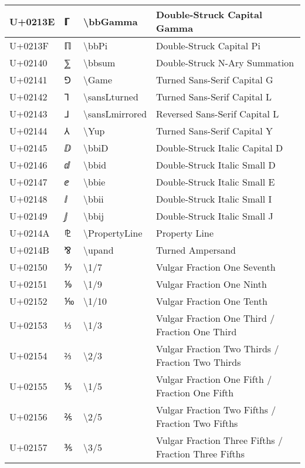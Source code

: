 \begin{table}[h]
\begin{tabulary}{\linewidth}{|L|L|L|L|}
\hline
U+0213E & ℾ & {\textbackslash}bbGamma & Double-Struck Capital Gamma \\
\hline
U+0213F & ℿ & {\textbackslash}bbPi & Double-Struck Capital Pi \\
\hline
U+02140 & ⅀ & {\textbackslash}bbsum & Double-Struck N-Ary Summation \\
\hline
U+02141 & ⅁ & {\textbackslash}Game & Turned Sans-Serif Capital G \\
\hline
U+02142 & ⅂ & {\textbackslash}sansLturned & Turned Sans-Serif Capital L \\
\hline
U+02143 & ⅃ & {\textbackslash}sansLmirrored & Reversed Sans-Serif Capital L \\
\hline
U+02144 & ⅄ & {\textbackslash}Yup & Turned Sans-Serif Capital Y \\
\hline
U+02145 & ⅅ & {\textbackslash}bbiD & Double-Struck Italic Capital D \\
\hline
U+02146 & ⅆ & {\textbackslash}bbid & Double-Struck Italic Small D \\
\hline
U+02147 & ⅇ & {\textbackslash}bbie & Double-Struck Italic Small E \\
\hline
U+02148 & ⅈ & {\textbackslash}bbii & Double-Struck Italic Small I \\
\hline
U+02149 & ⅉ & {\textbackslash}bbij & Double-Struck Italic Small J \\
\hline
U+0214A & ⅊ & {\textbackslash}PropertyLine & Property Line \\
\hline
U+0214B & ⅋ & {\textbackslash}upand & Turned Ampersand \\
\hline
U+02150 & ⅐ & {\textbackslash}1/7 & Vulgar Fraction One Seventh \\
\hline
U+02151 & ⅑ & {\textbackslash}1/9 & Vulgar Fraction One Ninth \\
\hline
U+02152 & ⅒ & {\textbackslash}1/10 & Vulgar Fraction One Tenth \\
\hline
U+02153 & ⅓ & {\textbackslash}1/3 & Vulgar Fraction One Third / Fraction One Third \\
\hline
U+02154 & ⅔ & {\textbackslash}2/3 & Vulgar Fraction Two Thirds / Fraction Two Thirds \\
\hline
U+02155 & ⅕ & {\textbackslash}1/5 & Vulgar Fraction One Fifth / Fraction One Fifth \\
\hline
U+02156 & ⅖ & {\textbackslash}2/5 & Vulgar Fraction Two Fifths / Fraction Two Fifths \\
\hline
U+02157 & ⅗ & {\textbackslash}3/5 & Vulgar Fraction Three Fifths / Fraction Three Fifths \\

\end{tabulary}
\end{table}

